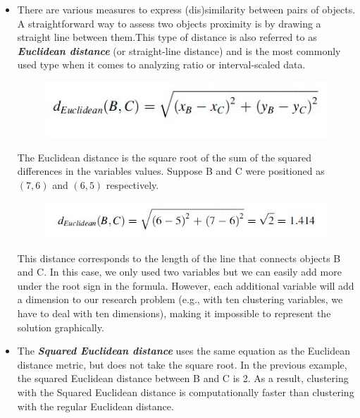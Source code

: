 \documentclass[a4paper,12pt]{report}
\begin{document}
\begin{itemize}
	\item There are various measures to express (dis)similarity between pairs of objects.
	A straightforward way to assess two objects proximity is by drawing a straight line
	between them.This type of distance is also referred to as
	\textbf{\textit{Euclidean distance}} (or straight-line distance) and is the most commonly used type
	when it comes to analyzing ratio or interval-scaled data.
	\begin{figure}[h!]
		\begin{center}
			\includegraphics[scale=0.6]{images/EuclidDistance1.jpg}\\
		\end{center}
	\end{figure}
	
	The Euclidean distance is the square root of the sum of the squared differences in
	the variables values. Suppose B and C were positioned as $(7,6)$ and $(6,5)$ respectively.
	\begin{figure}[h!]
		\begin{center}
			\includegraphics[scale=0.6]{images/EuclidDistance2.jpg}\\
		\end{center}
	\end{figure}
	
	This distance corresponds to the length of the line that connects objects B and C.
	In this case, we only used two variables but we can easily add more under the root
	sign in the formula. However, each additional variable will add a dimension to our
	research problem (e.g., with ten clustering variables, we have to deal with ten
	dimensions), making it impossible to represent the solution graphically.
	
	\item  The \textbf{\textit{Squared Euclidean distance}} uses the same equation as the Euclidean distance metric, but does not take the square root. In the previous example, the squared Euclidean distance between B and C is 2.
	As a result, clustering with the Squared Euclidean distance is computationally faster than clustering with the regular Euclidean distance.
	

\end{itemize}
\end{document}

